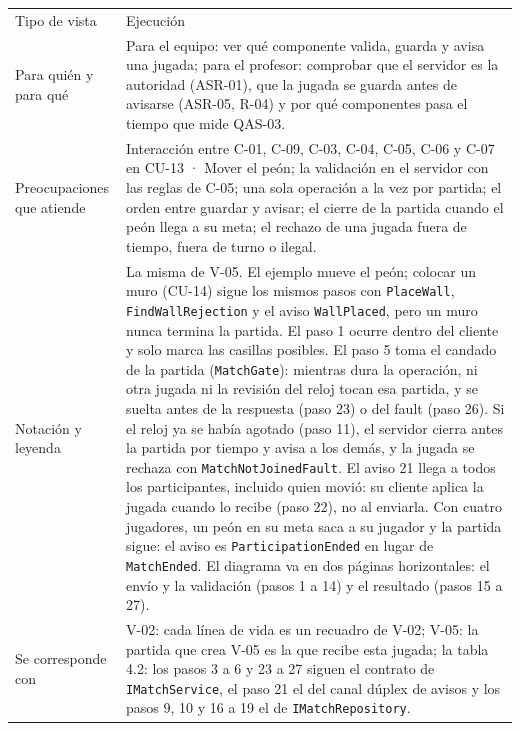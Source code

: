 \documentclass[11pt,letterpaper]{article}
\newenvironment{ficha}[1]
  {\par\smallskip\noindent\small\begin{tabular}{|L|>{\raggedright\arraybackslash}p{\dimexpr\linewidth-3.6cm-6\tabcolsep-3\arrayrulewidth\relax}|}\hline
   \rowcolor{SADHead}\multicolumn{2}{|>{\raggedright\arraybackslash}p{\dimexpr\linewidth-4\tabcolsep-2\arrayrulewidth\relax}|}{\bfseries #1}\\\hline}
  {\end{tabular}\par\medskip}
\newcommand{\frow}[2]{#1 & #2\\\hline}
\begin{document}
\begin{ficha}{V-06 · Hacer una jugada}
  \frow{Tipo de vista}{Ejecución}
  \frow{Para quién y para qué}{Para el equipo: ver qué componente valida, guarda y avisa una jugada; para el profesor: comprobar que el servidor es la autoridad (ASR-01), que la jugada se guarda antes de avisarse (ASR-05, R-04) y por qué componentes pasa el tiempo que mide QAS-03.}
  \frow{Preocupaciones que atiende}{Interacción entre C-01, C-09, C-03, C-04, C-05, C-06 y C-07 en CU-13 · Mover el peón; la validación en el servidor con las reglas de C-05; una sola operación a la vez por partida; el orden entre guardar y avisar; el cierre de la partida cuando el peón llega a su meta; el rechazo de una jugada fuera de tiempo, fuera de turno o ilegal.}
  \frow{Notación y leyenda}{La misma de V-05. El ejemplo mueve el peón; colocar un muro (CU-14) sigue los mismos pasos con \texttt{PlaceWall}, \texttt{FindWallRejection} y el aviso \texttt{WallPlaced}, pero un muro nunca termina la partida. El paso 1 ocurre dentro del cliente y solo marca las casillas posibles. El paso 5 toma el candado de la partida (\texttt{MatchGate}): mientras dura la operación, ni otra jugada ni la revisión del reloj tocan esa partida, y se suelta antes de la respuesta (paso 23) o del fault (paso 26). Si el reloj ya se había agotado (paso 11), el servidor cierra antes la partida por tiempo y avisa a los demás, y la jugada se rechaza con \texttt{MatchNotJoinedFault}. El aviso 21 llega a todos los participantes, incluido quien movió: su cliente aplica la jugada cuando lo recibe (paso 22), no al enviarla. Con cuatro jugadores, un peón en su meta saca a su jugador y la partida sigue: el aviso es \texttt{ParticipationEnded} en lugar de \texttt{MatchEnded}. El diagrama va en dos páginas horizontales: el envío y la validación (pasos 1 a 14) y el resultado (pasos 15 a 27).}
  \frow{Se corresponde con}{V-02: cada línea de vida es un recuadro de V-02; V-05: la partida que crea V-05 es la que recibe esta jugada; la tabla 4.2: los pasos 3 a 6 y 23 a 27 siguen el contrato de \texttt{IMatchService}, el paso 21 el del canal dúplex de avisos y los pasos 9, 10 y 16 a 19 el de \texttt{IMatchRepository}.}
\end{ficha}
\end{document}
